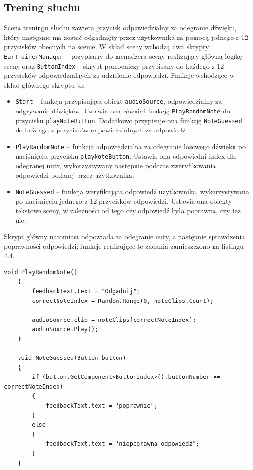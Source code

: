 \subsection{Trening słuchu}

Scena treningu słuchu zawiera przycisk odpowiedzialny za odegranie dźwięku, który następnie ma zostać odgadnięty przez użytkownika za pomocą jednego z 12 przycisków obecnych na scenie. W skład sceny wchodzą dwa skrypty: \texttt{EarTrainerManager} -- przypisany do menadżera sceny realizujący główną logikę sceny oraz \texttt{ButtonIndex} -- skrypt pomocniczy przypisany do każdego z 12 przycisków odpowiedzialnych za udzielenie odpowiedzi. Funkcje wchodzące w skład głównego skryptu to:
\begin{itemize}
    \item \texttt{Start} -- funkcja przypisująca obiekt \texttt{audioSource}, odpowiedzialny za odgrywanie dźwięków. Ustawia ona również funkcję \texttt{PlayRandomNote} do przycisku \texttt{playNoteButton}. Dodatkowo przypisuje ona funkcję \texttt{NoteGuessed} do każdego z przycisków odpowiedzialnych za odpowiedź.
    \item \texttt{PlayRandomNote} -- funkcja odpowiedzialna za odegranie losowego dźwięku po naciśnięciu przycisku \texttt{playNoteButton}. Ustawia ona odpowiedni index dla odegranej nuty, wykorzystywany następnie podczas zweryfikowania odpowiedzi podanej przez użytkownika.
    \item \texttt{NoteGuessed} -- funkcja weryfikująca odpowiedź użytkownika, wykorzystywana po naciśnięciu jednego z 12 przycisków odpowiedzi. Ustawia ona obiekty tekstowe sceny, w zależności od tego czy odpowiedź była poprawna, czy też nie. 
\end{itemize}

Skrypt główny natomiast odpowiada za odegranie nuty, a następnie sprawdzenia poprawności odpowiedzi, funkcje realizujące te zadania zamieszczono na listingu 4.4.

\begin{lstlisting}[style=sharpcstyle,caption=Funkcje \texttt{PlayRandomNote} i \texttt{NoteGuessed}, label=lst:4]
    void PlayRandomNote()
    {
        feedbackText.text = "Odgadnij"; 
        correctNoteIndex = Random.Range(0, noteClips.Count);
        
        audioSource.clip = noteClips[correctNoteIndex];
        audioSource.Play();
    }

    void NoteGuessed(Button button)
    {
        if (button.GetComponent<ButtonIndex>().buttonNumber == correctNoteIndex)
        {
            feedbackText.text = "poprawnie";
        }
        else
        {
            feedbackText.text = "niepoprawna odpowiedź";
        }
    }
\end{lstlisting}

